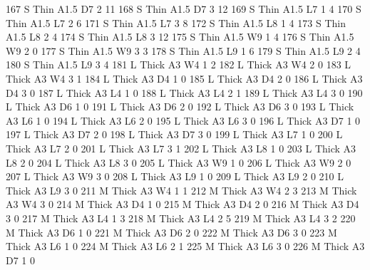 \documentclass{article}
\begin{document}
\begin{Schunk}
\begin{Soutput}
167       S   Thin A1.5      D7     2    11
168       S   Thin A1.5      D7     3    12
169       S   Thin A1.5      L7     1     4
170       S   Thin A1.5      L7     2     6
171       S   Thin A1.5      L7     3     8
172       S   Thin A1.5      L8     1     4
173       S   Thin A1.5      L8     2     4
174       S   Thin A1.5      L8     3    12
175       S   Thin A1.5      W9     1     4
176       S   Thin A1.5      W9     2     0
177       S   Thin A1.5      W9     3     3
178       S   Thin A1.5      L9     1     6
179       S   Thin A1.5      L9     2     4
180       S   Thin A1.5      L9     3     4
181       L  Thick   A3      W4     1     2
182       L  Thick   A3      W4     2     0
183       L  Thick   A3      W4     3     1
184       L  Thick   A3      D4     1     0
185       L  Thick   A3      D4     2     0
186       L  Thick   A3      D4     3     0
187       L  Thick   A3      L4     1     0
188       L  Thick   A3      L4     2     1
189       L  Thick   A3      L4     3     0
190       L  Thick   A3      D6     1     0
191       L  Thick   A3      D6     2     0
192       L  Thick   A3      D6     3     0
193       L  Thick   A3      L6     1     0
194       L  Thick   A3      L6     2     0
195       L  Thick   A3      L6     3     0
196       L  Thick   A3      D7     1     0
197       L  Thick   A3      D7     2     0
198       L  Thick   A3      D7     3     0
199       L  Thick   A3      L7     1     0
200       L  Thick   A3      L7     2     0
201       L  Thick   A3      L7     3     1
202       L  Thick   A3      L8     1     0
203       L  Thick   A3      L8     2     0
204       L  Thick   A3      L8     3     0
205       L  Thick   A3      W9     1     0
206       L  Thick   A3      W9     2     0
207       L  Thick   A3      W9     3     0
208       L  Thick   A3      L9     1     0
209       L  Thick   A3      L9     2     0
210       L  Thick   A3      L9     3     0
211       M  Thick   A3      W4     1     1
212       M  Thick   A3      W4     2     3
213       M  Thick   A3      W4     3     0
214       M  Thick   A3      D4     1     0
215       M  Thick   A3      D4     2     0
216       M  Thick   A3      D4     3     0
217       M  Thick   A3      L4     1     3
218       M  Thick   A3      L4     2     5
219       M  Thick   A3      L4     3     2
220       M  Thick   A3      D6     1     0
221       M  Thick   A3      D6     2     0
222       M  Thick   A3      D6     3     0
223       M  Thick   A3      L6     1     0
224       M  Thick   A3      L6     2     1
225       M  Thick   A3      L6     3     0
226       M  Thick   A3      D7     1     0

\end{Soutput}
\end{Schunk}
\end{document}
